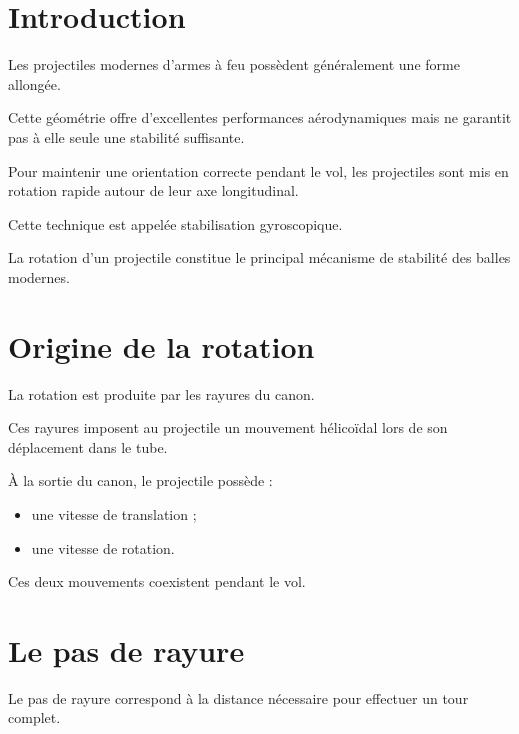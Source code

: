 
\section{Introduction}

Les projectiles modernes d'armes à feu possèdent généralement une forme
allongée.

Cette géométrie offre d'excellentes performances aérodynamiques mais ne
garantit pas à elle seule une stabilité suffisante.

Pour maintenir une orientation correcte pendant le vol, les projectiles sont
mis en rotation rapide autour de leur axe longitudinal.

Cette technique est appelée stabilisation gyroscopique.

\begin{aretenir}

La rotation d'un projectile constitue le principal mécanisme de stabilité des
balles modernes.

\end{aretenir}

\section{Origine de la rotation}

La rotation est produite par les rayures du canon.

Ces rayures imposent au projectile un mouvement hélicoïdal lors de son
déplacement dans le tube.

À la sortie du canon, le projectile possède :

\begin{itemize}
    \item une vitesse de translation ;
    \item une vitesse de rotation.
\end{itemize}

Ces deux mouvements coexistent pendant le vol.

\section{Le pas de rayure}

Le pas de rayure correspond à la distance nécessaire pour effectuer un tour
complet.

